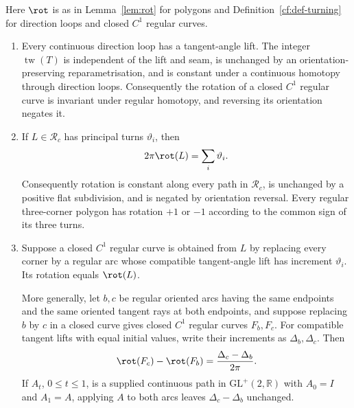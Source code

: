 \begin{lemma}\label{cf:lem-turnlift}\leanok
Here $\rot$ is as in Lemma~\ref{lem:rot} for polygons and
Definition~\ref{cf:def-turning} for direction loops and closed $C^1$
regular curves.
\begin{enumerate}
\item[(i)] Every continuous direction loop has a tangent-angle lift.
The integer $\operatorname{tw}(T)$ is independent of the lift and seam,
is unchanged by an orientation-preserving reparametrisation, and is constant
under a continuous homotopy through direction loops. Consequently the rotation
of a closed $C^1$ regular curve is invariant under regular homotopy, and
reversing its orientation negates it.
\item[(ii)] If $L\in\mathcal R_c$ has principal turns $\vartheta_i$, then
\[
   2\pi\rot(L)=\sum_i\vartheta_i.
\]
Consequently rotation is constant along every path in $\mathcal R_c$, is
unchanged by a positive flat subdivision, and is negated by orientation
reversal. Every regular three-corner polygon has rotation $+1$ or $-1$
according to the common sign of its three turns.
\item[(iii)] Suppose a closed $C^1$ regular curve is obtained from $L$ by
replacing every corner by a regular arc whose compatible tangent-angle lift
has increment $\vartheta_i$. Its rotation equals $\rot(L)$.

More generally, let $b,c$ be regular oriented arcs having the same endpoints
and the same oriented tangent rays at both endpoints, and suppose replacing
$b$ by $c$ in a closed curve gives closed $C^1$ regular curves $F_b,F_c$.
For compatible tangent lifts with equal initial values, write their increments
as $\Delta_b,\Delta_c$. Then
\[
   \rot(F_c)-\rot(F_b)=\frac{\Delta_c-\Delta_b}{2\pi}.
\]
If $A_t$, $0\leq t\leq1$, is a supplied continuous path in
$\mathrm{GL}^+(2,\mathbb R)$ with $A_0=I$ and $A_1=A$, applying $A$ to both
arcs leaves $\Delta_c-\Delta_b$ unchanged.
\end{enumerate}

\end{lemma}

